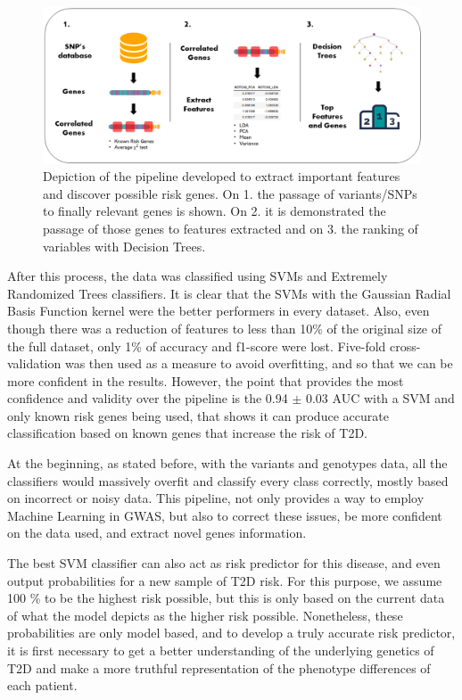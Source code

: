 \begin{figure}[h]
	\centering
	\includegraphics[width=\textwidth]{../images/discussion/feature_diagram.png}
	\caption{Depiction of the pipeline developed to extract important features and discover possible risk genes. On 1. the passage of variants/\gls{SNP}s to finally relevant genes is shown. On 2. it is demonstrated the passage of those genes to features extracted and on 3. the ranking of variables with Decision Trees. } 
	\label{fig:feature_engi}
\end{figure}

After this process, the data was classified using \gls{SVM}s and Extremely Randomized Trees classifiers. It is clear that the \gls{SVM}s with the Gaussian Radial Basis Function kernel were the better performers in every dataset. Also, even though there was a reduction of features to less than 10\% of the original size of the full dataset, only 1\% of accuracy and f1-score were lost. Five-fold cross-validation was then used as a measure to avoid overfitting, and so that we can be more confident in the results. However, the point that provides the most confidence and validity over the pipeline is the 0.94 $\pm$ 0.03 \gls{AUC} with a \gls{SVM} and only known risk genes being used, that shows it can produce accurate classification based on known genes that increase the risk of \gls{T2D}.

At the beginning, as stated before, with the variants and genotypes data, all the classifiers would massively overfit and classify every class correctly, mostly based on incorrect or noisy data. This pipeline, not only provides a way to employ Machine Learning in \gls{GWAS}, but also to correct these issues, be more confident on the data used, and extract novel genes information.

The best \gls{SVM} classifier can also act as risk predictor for this disease, and even output probabilities for a new sample of \gls{T2D} risk. For this purpose, we assume 100 \% to be the highest risk possible, but this is only based on the current data of what the model depicts as the higher risk possible. Nonetheless, these probabilities are only model based, and to develop a truly accurate risk predictor, it is first necessary to get a better understanding of the underlying genetics of \gls{T2D} and make a more truthful representation of the phenotype differences of each patient.

